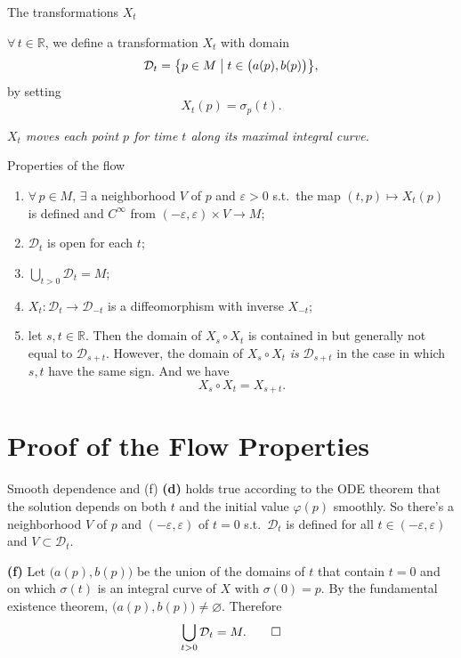 \documentclass[10pt]{beamer}
\newcommand{\R}{\mathbb{R}}
\newcommand{\D}{\mathcal{D}}
\begin{document}
\begin{frame}{The transformations $X_t$}
	\begin{definition}
		$\forall\, t \in \R$, we define a transformation $X_t$ with
		domain
		\[
			\D_t = \bigl\{ p \in M \bigm|
			t \in \bigl( a(p), b(p) \bigr) \bigr\},
		\]
		by setting
		\[
			X_t(p) = \sigma_p(t).
		\]
	\end{definition}
	\medskip
	\begin{center}
		\emph{$X_t$ moves each point $p$ for time $t$ along its
			maximal integral curve.}
	\end{center}
\end{frame}

\begin{frame}{Properties of the flow}
	\begin{theorem}
		\begin{enumerate}
			\item[(d)] $\forall\, p \in M$, $\exists$ a neighborhood $V$
			      of $p$ and $\varepsilon > 0$ s.t.\ the map
			      $(t, p) \longmapsto X_t(p)$ is defined and $C^\infty$
			      from $(-\varepsilon, \varepsilon) \times V \to M$;
			\item[(e)] $\D_t$ is open for each $t$;
			\item[(f)] $\bigcup_{t > 0} \D_t = M$;
			\item[(g)] $X_t : \D_t \longrightarrow \D_{-t}$ is a
			      diffeomorphism with inverse $X_{-t}$;
			\item[(h)] let $s, t \in \R$. Then the domain of $X_s \circ X_t$
			      is contained in but generally not equal to $\D_{s+t}$.
			      However, the domain of $X_s \circ X_t$ \emph{is}
			      $\D_{s+t}$ in the case in which $s, t$ have the same
			      sign. And we have
			      \[
				      X_s \circ X_t = X_{s+t}.
			      \]
		\end{enumerate}
	\end{theorem}
\end{frame}

\section{Proof of the Flow Properties}

\begin{frame}{Smooth dependence and (f)}
	\textbf{(d)} holds true according to the ODE theorem that the
	solution depends on both $t$ and the initial value $\varphi(p)$
	smoothly. So there's a neighborhood $V$ of $p$ and
	$(-\varepsilon, \varepsilon)$ of $t = 0$ s.t.\ $\D_t$ is defined
	for all $t \in (-\varepsilon, \varepsilon)$ and $V \subset \D_t$.
	\bigskip

	\textbf{(f)} Let $\bigl( a(p), b(p) \bigr)$ be the union of the
	domains of $t$ that contain $t = 0$ and on which $\sigma(t)$ is an
	integral curve of $X$ with $\sigma(0) = p$. By the fundamental
	existence theorem, $\bigl( a(p), b(p) \bigr) \neq \varnothing$.
	Therefore
	\[
		\bigcup_{t > 0} \D_t = M . \qed
	\]
\end{frame}
\end{document}

